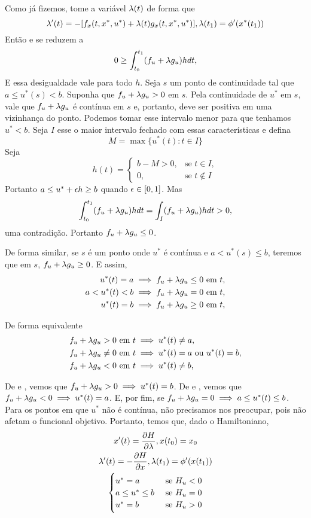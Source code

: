 Como já fizemos, tome a variável $\lambda(t)$ de forma que 
$$
\lambda '(t) = -[f_x(t,x^*, u^*) + \lambda(t)g_x(t,x^*,u^*)], \lambda(t_1) = \phi '(x^*(t_1))
$$
Então  e  se reduzem a 
$$
0 \ge \int_{t_0}^{t_1} (f_u + \lambda g_u)h dt,
$$
E essa desigualdade vale para todo $h$. Seja $s$ um ponto de continuidade tal
que $a \le u^*(s) < b$. Suponha que $f_u + \lambda g_u > 0$ em $s$. Pela
continuidade de $u^*$ em $s$, vale que $f_u + \lambda g_u$ é contínua em $s$ e,
portanto, deve ser positiva em uma vizinhança do ponto. Podemos tomar esse
intervalo menor para que tenhamos $u^* < b$. Seja $I$ esse o maior intervalo
fechado com essas características e defina 
$$
M = \max\{u^*(t): t \in I\}
$$
Seja 
$$
h(t) = \begin{cases}
    b - M > 0, &\text{se }t \in I, \\
    0,     &\text{se }t \not\in I
\end{cases}
$$
Portanto $a \le u^* + \epsilon h \ge b$ quando $\epsilon \in [0,1]$. Mas
$$
\int_{t_0}^{t_1} (f_u + \lambda g_u)h dt = \int_I (f_u + \lambda g_u)h dt > 0,
$$
uma contradição. Portanto $f_u + \lambda g_u \le 0$. 

De forma similar, se $s$ é um ponto onde $u^*$ é contínua e $a < u^*(s) \le
b$, teremos que em $s$, $f_u + \lambda g_u \ge 0$. E assim, 
\begin{align*}
    u^*(t) = a &\implies f_u + \lambda g_u \le 0 \text{ em } t, \\
    a < u^*(t) < b &\implies f_u + \lambda g_u = 0 \text{ em } t, \\
    u^*(t) = b &\implies f_u + \lambda g_u \ge 0 \text{ em } t, 
\end{align*}

De forma equivalente 
\begin{align}
    \label{eq:8-3}
    f_u + \lambda g_u > 0 \text{ em } t &\implies u^*(t) \neq a , \\
    \label{eq:8-4}
    f_u + \lambda g_u \neq 0 \text{ em } t  &\implies u^*(t)=a \text{ ou } u^*(t)=b, \\
    \label{eq:8-5}
    f_u + \lambda g_u < 0 \text{ em } t &\implies u^*(t) \neq b, 
\end{align}

De  e , vemos que $f_u + \lambda g_u > 0 \implies
u^*(t) = b$. De  e , vemos que $f_u + \lambda g_u < 0
\implies u^*(t) = a$. E, por fim, se $f_u + \lambda g_u = 0 \implies a \le u^*(t)
\le b$. Para os pontos em que $u^*$ não é contínua, não precisamos nos
preocupar, pois não afetam o funcional objetivo. Portanto, temos que, dado o
Hamiltoniano, 
\begin{gather*}
    x'(t) = \frac{\partial H}{\partial \lambda}, x(t_0) = x_0 \\ 
    \lambda '(t) = - \frac{\partial H}{\partial x}, \lambda(t_1) = \phi '(x(t_1)) \\
    \begin{cases}
        u^* = a &\text{ se } H_u < 0 \\
        a \le u^* \le b &\text{ se } H_u = 0 \\
        u^* = b &\text{ se } H_u > 0 \\
    \end{cases}
\end{gather*}

